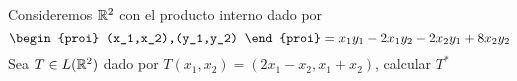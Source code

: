 \item Consideremos $\mathbb{R}^2$ con el producto interno dado por \[\begin{proi}
        (x_1,x_2),(y_1,y_2)
    \end{proi}=x_1y_1-2x_1y_2-2x_2y_1+8x_2y_2\]
    Sea $T\in L(\mathbb{R}^2)$ dado por $T(x_1,x_2)=(2x_1-x_2,x_1+x_2)$, calcular $T^*$
    \begin{mdframed}[style=s]
        
    \end{mdframed}